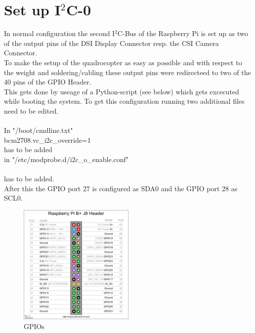 \newpage

\section{Set up I$^2$C-0}
\label{sec:setupi2c0}


In normal configuration the second I$^2$C-Bus of the Raspberry Pi is set up as two of the output pins of the DSI Display Connector resp. the CSI Camera Connector.\\
To make the setup of the quadrocopter as easy as possible and with respect to the weight and soldering/cabling these output pins were redirecteed to two of the 40 pins of the GPIO Header.\\

This gets done by useage of a Python-script (see below) which gets excecuted while booting the system. To get this configuration running two additional files need to be edited.\\\\
In "/boot/cmdline.txt"\\
\ttfamily bcm2708.vc\_i2c\_override=1 \\
\normalfont has to be added\\
in "/etc/modprobe.d/i2c\_o\_enable.conf"\\
 \\
\normalfont has to be added.\\

After this the GPIO port 27 is configured as SDA0 and the GPIO port 28 as SCL0.

\begin{figure}[H]
	\centering\includegraphics[width=0.5\textwidth]{fig/ch-i2c_configuration/gpios}
	\caption{GPIOs \footnotemark}
	\label{fig:gpios}
\end{figure}
\newpage







